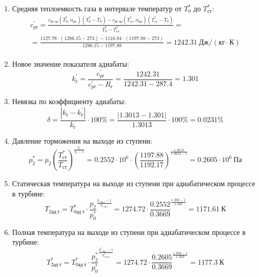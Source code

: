 \documentclass[a4paper,10pt]{article}
\begin{document}
\begin{enumerate}
        \item Средняя теплоемкость газа в интервале температур от $T_0^*$ до $T_{ст}^*$:
        \begin{gather*}
            c_{pг}^\prime = \frac{
		        c_{pг\ ср} (T_0^*, \alpha_{вх}) (T_0^* - T_0) - c_{pг\ ср} (T_{ст}^*, \alpha_{вх})(T_{ст}^* - T_0)
		    }{
		        T_0^* - T_{ст}^*} =\\
            =\frac{
		        1127.78 \cdot
                (1286.15 - 273) -
		        1116.84 \cdot
                (1197.88 - 273)
		    }{
		        1286.15 - 1197.88} =
		    1242.31 \ Дж / (кг \cdot К)\\
        \end{gather*}

        \item Новое значение показателя адиабаты:
        \[
            k_г^\prime = \frac{c_{pг}^\prime}{c_{pг}^\prime - R_г} =
                \frac{
                    1242.31
                }{
                    1242.31 - 287.4
                }
            = 1.301
        \]

        \item Невязка по коэффициенту адиабаты:
        \[
            \delta = \frac{ \left| k_г - k_г^\prime \right| }{ k_г } \cdot 100 \%=
                \frac{
                    \left| 1.3013 - 1.301 \right|
                }{
                    1.3013
                } \cdot 100 \% =
            0.0231 \%
        \]

        \item Давление торможения на выходе из ступени:
        \[
            p_2^* = p_2 \left(
                            \frac{ T_{ст}^* }{ T_{ст} }
                    \right) ^ \frac{ k_г }{ k_г - 1 } =
                 0.2552 \cdot 10^6 \cdot \left(
                            \frac{ 1197.88 }{ 1192.17 }
                    \right) ^
                \frac{ 1.3013 }{ 1.3013 - 1 } =
            0.2605 \cdot 10^6 \ Па
        \]

        \item Статическая температура на выходе из ступени при адиабатическом процессе в турбине:
        \[
            T_{2ад\ т} = T_{0ад\ т}^* \cdot \frac{p_2}{p_0^*} ^ {
                    \frac{k_{г\ ад\ т} - 1}{k_{г\ ад\ т} }
            } = 1274.72 \cdot
            \frac{ 0.2552
            }{
            0.3669
            } ^ {
                    \frac{1.303 - 1}{1.303}
            } =
            1171.61\ К
        \]

        \item Полная температура на выходе из ступени при адиабатическом процессе в турбине:
        \[
            T_{2ад\ т}^* = T_{0ад\ т}^* \cdot \frac{p_2^*}{p_0^*} ^ {
                    \frac{k_{г\ ад\ т}^* - 1}{k_{г\ ад\ т}^*}
            } = 1274.72 \cdot
            \frac{ 0.2605
            }{
            0.3669
            } ^ {
                    \frac{1.303 - 1}{1.303}
            } =
            1177.3\ К
        \]


\end{enumerate}
\end{document}
